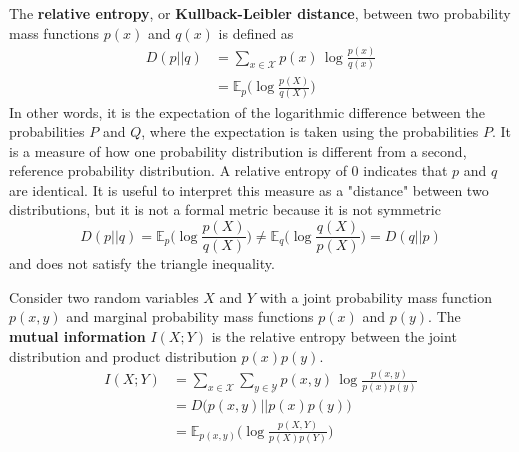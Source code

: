 \documentclass{article}
\begin{document}
  \begin{definition}
  The \textbf{relative entropy}, or \textbf{Kullback-Leibler distance}, between two probability mass functions $p(x)$ and $q(x)$ is defined as 
  \begin{align*}
      D(p||q) & = \sum_{x \in \mathcal{X}} p(x) \, \log \frac{p(x)}{q(x)} \\
      & = \mathbb{E}_p \bigg( \log \frac{p(X)}{q(X)} \bigg)
  \end{align*}
  In other words, it is the expectation of the logarithmic difference between the probabilities $P$ and $Q$, where the expectation is taken using the probabilities $P$. It is a measure of how one probability distribution is different from a second, reference probability distribution. A relative entropy of $0$ indicates that $p$ and $q$ are identical. It is useful to interpret this measure as a "distance" between two distributions, but it is not a formal metric because it is not symmetric 
  \[D(p||q) = \mathbb{E}_p \bigg( \log \frac{p(X)}{q(X)} \bigg) \neq \mathbb{E}_q \bigg( \log \frac{q(X)}{p(X)} \bigg) = D(q||p)\]
  and does not satisfy the triangle inequality. 
  \end{definition}

  \begin{definition}
  Consider two random variables $X$ and $Y$ with a joint probability mass function $p(x, y)$ and marginal probability mass functions $p(x)$ and $p(y)$. The \textbf{mutual information} $I(X; Y)$ is the relative entropy between the joint distribution and product distribution $p(x) p(y)$. 
  \begin{align*}
      I(X;Y) & = \sum_{x \in \mathcal{X}} \sum_{y \in \mathcal{Y}} p(x, y)\, \log \frac{p(x, y)}{p(x) p(y)} \\
      & = D\big( p(x, y)||p(x) p(y)\big) \\
      & = \mathbb{E}_{p(x, y)} \bigg( \log \frac{p(X, Y)}{p(X) p(Y)} \bigg)
  \end{align*}
  \end{definition}
\end{document}
